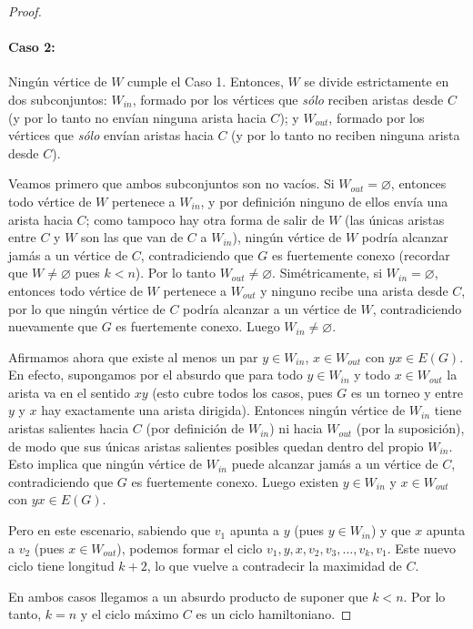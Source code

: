 \begin{proof}
	\paragraph{Caso 2:} Ningún vértice de \( W \) cumple el Caso 1.
	Entonces, \( W \) se divide estrictamente en dos subconjuntos: \( W_{in} \), formado por los vértices que \textit{sólo} reciben aristas desde \( C \) (y por lo tanto no envían ninguna arista hacia \( C \)); y \( W_{out} \), formado por los vértices que \textit{sólo} envían aristas hacia \( C \) (y por lo tanto no reciben ninguna arista desde \( C \)).

	Veamos primero que ambos subconjuntos son no vacíos. Si \( W_{out} = \varnothing \), entonces todo vértice de \( W \) pertenece a \( W_{in} \), y por definición ninguno de ellos envía una arista hacia \( C \); como tampoco hay otra forma de salir de \( W \) (las únicas aristas entre \( C \) y \( W \) son las que van de \( C \) a \( W_{in} \)), ningún vértice de \( W \) podría alcanzar jamás a un vértice de \( C \), contradiciendo que \( G \) es fuertemente conexo (recordar que \( W \neq \varnothing \) pues \( k < n \)). Por lo tanto \( W_{out} \neq \varnothing \). Simétricamente, si \( W_{in} = \varnothing \), entonces todo vértice de \( W \) pertenece a \( W_{out} \) y ninguno recibe una arista desde \( C \), por lo que ningún vértice de \( C \) podría alcanzar a un vértice de \( W \), contradiciendo nuevamente que \( G \) es fuertemente conexo. Luego \( W_{in} \neq \varnothing \).

	Afirmamos ahora que existe al menos un par \( y \in W_{in} \), \( x \in W_{out} \) con \( yx \in E(G) \). En efecto, supongamos por el absurdo que para todo \( y \in W_{in} \) y todo \( x \in W_{out} \) la arista va en el sentido \( xy \) (esto cubre todos los casos, pues \( G \) es un torneo y entre \( y \) y \( x \) hay exactamente una arista dirigida). Entonces ningún vértice de \( W_{in} \) tiene aristas salientes hacia \( C \) (por definición de \( W_{in} \)) ni hacia \( W_{out} \) (por la suposición), de modo que sus únicas aristas salientes posibles quedan dentro del propio \( W_{in} \). Esto implica que ningún vértice de \( W_{in} \) puede alcanzar jamás a un vértice de \( C \), contradiciendo que \( G \) es fuertemente conexo. Luego existen \( y \in W_{in} \) y \( x \in W_{out} \) con \( yx \in E(G) \).

	Pero en este escenario, sabiendo que \( v_1 \) apunta a \( y \) (pues \( y \in W_{in} \)) y que \( x \) apunta a \( v_2 \) (pues \( x \in W_{out} \)), podemos formar el ciclo \( v_1, y, x, v_2, v_3, \ldots, v_k, v_1 \). Este nuevo ciclo tiene longitud \( k+2 \), lo que vuelve a contradecir la maximidad de \( C \).

	En ambos casos llegamos a un absurdo producto de suponer que \( k < n \). Por lo tanto, \( k = n \) y el ciclo máximo \( C \) es un ciclo hamiltoniano.
\end{proof}
